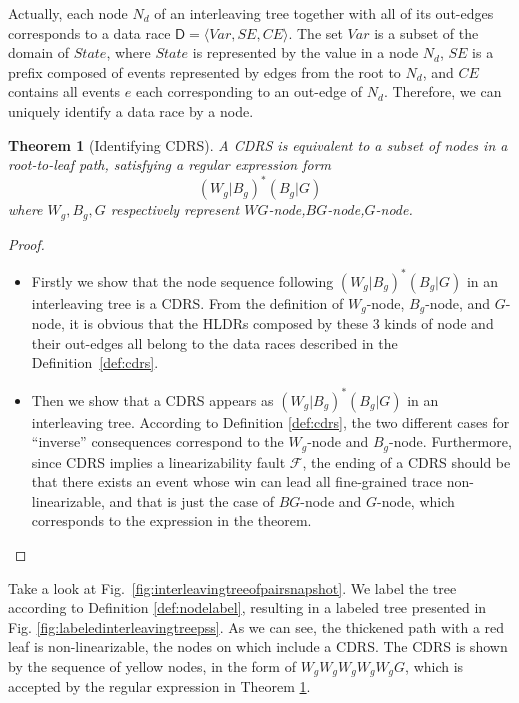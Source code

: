 \documentclass[runningheads]{llncs}
\newcommand{\pair}[1]{{\langle{#1}\rangle}}
\newtheorem{myTheo}{Theorem}
\begin{document}
Actually, each node $N_d$ of an interleaving tree together with all of its out-edges corresponds to a data race $\mathsf{D} = \pair{\mathit{Var}, \mathit{SE},\mathit{CE}}$. The set $\mathit{Var}$ is a subset of the domain of $\mathit{State}$, where $\mathit{State}$ is represented by the value in a node $N_d$, $\mathit{SE}$ is a prefix composed of events represented by edges from the root to $N_d$, and $\mathit{CE}$ contains all events $e$ each corresponding to an out-edge of $N_d$. Therefore, we can uniquely identify a data race by a node.

\begin{myTheo}[Identifying CDRS]\label{theo:idenfycdrs}
    A CDRS is equivalent to a subset of nodes in a root-to-leaf path, satisfying a regular expression form
    $$(W_g|B_g)^*(B_g|G)$$
    where $W_g,B_g,G$ respectively represent $\mathit{WG}$-node,$\mathit{BG}$-node,$\mathit{G}$-node.
\end{myTheo}





\begin{proof}



\begin{itemize}
\item Firstly we show that the node sequence following $(W_g|B_g)^*(B_g|G)$ in an interleaving tree is a CDRS.
From the definition of $W_g$-node, $B_g$-node, and $G$-node, it is obvious that the HLDRs composed by these 3 kinds of node and their out-edges all belong to the
data races described in the Definition~\ref{def:cdrs}.

\item Then we show that a CDRS appears as $(W_g|B_g)^*(B_g|G)$ in an interleaving tree.
According to Definition \ref{def:cdrs}, the two different cases for ``inverse'' consequences correspond to 
the $W_g$-node and $B_g$-node. Furthermore, since CDRS implies a linearizability fault $\mathcal{F}$, the ending of a CDRS 
should be that there exists an event whose win can lead all fine-grained trace non-linearizable, and that is just the case of $BG$-node 
and $G$-node, which corresponds to the expression in the theorem.
\end{itemize}
 
 \end{proof}








\begin{example}
Take a look at Fig.~\ref{fig:interleavingtreeofpairsnapshot}.  We label the tree according to Definition \ref{def:nodelabel}, resulting in a labeled tree presented in Fig. \ref{fig:labeledinterleavingtreepss}.  As we can see, the thickened path with a red leaf is non-linearizable, the nodes on which include a CDRS. The CDRS is shown by the sequence of yellow nodes, in the form of $\mathit{W_gW_gW_gW_gW_gG}$, which is accepted by the regular expression in Theorem \ref{theo:idenfycdrs}.

\end{example}
\end{document}
